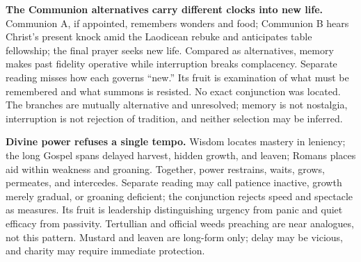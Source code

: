 \noindent\textbf{The Communion alternatives carry different clocks into new life.\enspace{}}
Communion A, if appointed, remembers wonders and food; Communion B hears Christ's present knock amid the Laodicean rebuke and anticipates table fellowship; the final prayer seeks new life. Compared as alternatives, memory makes past fidelity operative while interruption breaks complacency. Separate reading misses how each governs “new.” Its fruit is examination of what must be remembered and what summons is resisted. No exact conjunction was located. The branches are mutually alternative and unresolved; memory is not nostalgia, interruption is not rejection of tradition, and neither selection may be inferred.

\noindent\textbf{Divine power refuses a single tempo.\enspace{}}
Wisdom locates mastery in leniency; the long Gospel spans delayed harvest, hidden growth, and leaven; Romans places aid within weakness and groaning. Together, power restrains, waits, grows, permeates, and intercedes. Separate reading may call patience inactive, growth merely gradual, or groaning deficient; the conjunction rejects speed and spectacle as measures. Its fruit is leadership distinguishing urgency from panic and quiet efficacy from passivity. Tertullian and official weeds preaching are near analogues, not this pattern. Mustard and leaven are long-form only; delay may be vicious, and charity may require immediate protection.
